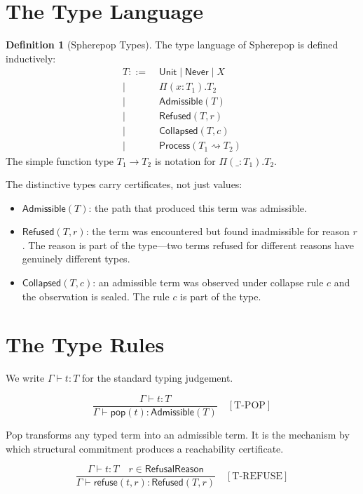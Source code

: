 \documentclass[12pt, a4paper, openany]{book}
\theoremstyle{plain}
\theoremstyle{definition}
\newtheorem{definition}[theorem]{Definition}
\theoremstyle{remark}
\newcommand{\Adm}{\mathsf{Admissible}}
\newcommand{\Rfsd}{\mathsf{Refused}}
\newcommand{\Col}{\mathsf{Collapsed}}
\newcommand{\Proc}{\mathsf{Process}}
\begin{document}
\section{The Type Language}

\begin{definition}[Spherepop Types]
The type language of Spherepop is defined inductively:
\begin{align*}
T ::=\; & \mathsf{Unit} \mid \mathsf{Never} \mid X \\
\mid\; & \Pi(x : T_1).T_2 \\
\mid\; & \Adm(T) \\
\mid\; & \Rfsd(T, r) \\
\mid\; & \Col(T, c) \\
\mid\; & \Proc(T_1 \rightsquigarrow T_2)
\end{align*}
The simple function type $T_1 \to T_2$ is notation for $\Pi(\_ : T_1).T_2$.
\end{definition}

The distinctive types carry certificates, not just values:
\begin{itemize}
\item $\Adm(T)$: the path that produced this term was admissible.
\item $\Rfsd(T, r)$: the term was encountered but found inadmissible for reason
$r$. The reason is part of the type---two terms refused for different reasons
have genuinely different types.
\item $\Col(T, c)$: an admissible term was observed under collapse rule $c$ and
the observation is sealed. The rule $c$ is part of the type.
\end{itemize}

\section{The Type Rules}

We write $\Gamma \vdash t : T$ for the standard typing judgement.

\[
\frac{\Gamma \vdash t : T}{\Gamma \vdash \mathsf{pop}(t) : \Adm(T)} \quad [\mathrm{T\text{-}POP}]
\]

Pop transforms any typed term into an admissible term. It is the mechanism by
which structural commitment produces a reachability certificate.

\[
\frac{\Gamma \vdash t : T \quad r \in \mathsf{RefusalReason}}{\Gamma \vdash \mathsf{refuse}(t, r) : \Rfsd(T, r)} \quad [\mathrm{T\text{-}REFUSE}]
\]
\end{document}
